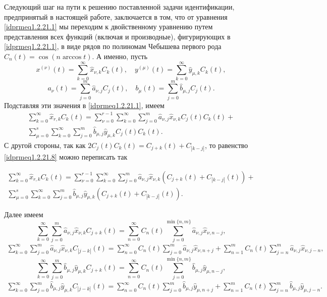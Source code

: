 Следующий шаг на пути к решению поставленной задачи идентификации, предпринятый в настоящей работе, заключается в том, что от уравнения
\eqref{idprmeq1.2.21.1} мы переходим к двойственному уравнению путем представления всех функций (включая и производные), фигурирующих в \eqref{idprmeq1.2.21.1}, в виде рядов по  полиномам  Чебышева первого рода $C_n(t)=\cos(n\arccos t)$.  А именно, пусть
\begin{equation}\label{idprmeq1.2.21.6}
  x^{(\nu)}(t)=\sum_{k=0}^\infty \hat x_{\nu,k}C_k(t),\quad y^{(\mu)}(t)=\sum_{k=0}^\infty \hat y_{\mu,k}C_k(t),
\end{equation}
\begin{equation}\label{idprmeq1.2.21.7}
a_\nu(t)=\sum_{j=0}^m \hat a_{\nu,j}C_j(t),\quad b_\mu(t)=\sum_{j=0}^m \hat b_{\mu,j}C_j(t).
\end{equation}
Подставляя эти значения в \eqref{idprmeq1.2.21.1}, имеем
\begin{multline}\label{idprmeq1.2.21.8}
\sum_{k=0}^\infty \hat x_{r,k}C_k(t)=\sum_{\nu=0}^{r-1} \sum_{k=0}^\infty\sum_{j=0}^m \hat a_{\nu,j} \hat x_{\nu,k}C_j(t)C_k(t)+\\
\sum_{\mu=0}^s \sum_{k=0}^\infty\sum_{j=0}^m \hat b_{\mu,j} \hat y_{\mu,k}C_j(t)C_k(t).
\end{multline}
С другой стороны, так как $2C_j(t)C_k(t)=C_{j+k}(t)+C_{|k-j|}$, то равенство \eqref{idprmeq1.2.21.8} можно переписать так

\begin{multline}\label{idprmeq1.2.21.9}
\sum_{k=0}^\infty\hat x_{r,k}C_{k}(t)= \sum_{\nu=0}^{r-1} \sum_{k=0}^\infty\sum_{j=0}^m \hat a_{\nu,j} \hat x_{\nu,k}(C_{j+k}(t)+C_{|k-j|}(t))+\\
\sum_{\mu=0}^s \sum_{k=0}^\infty\sum_{j=0}^m \hat b_{\mu,j} \hat y_{\mu,k}(C_{j+k}(t)+C_{|k-j|}(t)).
\end{multline}

Далее имеем
\begin{equation}\label{idprmeq1.2.21.10}
\sum_{k=0}^\infty\sum_{j=0}^m \hat a_{\nu,j} \hat x_{\nu,k}C_{j+k}(t)= \sum_{n=0}^\infty C_n(t)\sum_{j=0}^{\min\{n,m\}}\hat a_{\nu,j} \hat x_{\nu,n-j},
\end{equation}
\begin{multline}\label{idprmeq1.2.21.11}
\sum_{k=0}^\infty\sum_{j=0}^m \hat a_{\nu,j} \hat x_{\nu,k}C_{|j-k|}(t)= \sum_{n=0}^\infty C_n(t)\sum_{j=0}^m\hat a_{\nu,j}\hat x_{\nu,n+j}+%
\sum_{n=1}^m C_n(t)\sum_{j=n}^m\hat a_{\nu,j}\hat x_{\nu,j-n},
\end{multline}
\begin{equation}\label{idprmeq1.2.21.12}
\sum_{k=0}^\infty\sum_{j=0}^m \hat b_{\mu,j} \hat y_{\mu,k}C_{j+k}(t)= \sum_{n=0}^\infty C_n(t)\sum_{j=0}^{\min\{n,m\}}\hat b_{\mu,j} \hat y_{\mu,n-j},
\end{equation}
\begin{multline}\label{idprmeq1.2.21.13}
\sum_{k=0}^\infty\sum_{j=0}^m \hat b_{\mu,j} \hat y_{\mu,k}C_{|j-k|}(t)= \sum_{n=0}^\infty C_n(t)\sum_{j=0}^m\hat b_{\mu,j}\hat y_{\mu,n+j}+%
\sum_{n=1}^m C_n(t)\sum_{j=n}^m\hat b_{\mu,j}\hat y_{\mu,j-n}.
\end{multline}

